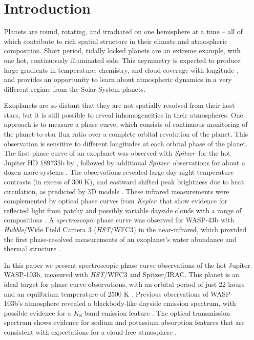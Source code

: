 \documentclass[twocolumn]{aastex61}
\newcommand{\project}[1]{\textsl{#1}}
\newcommand{\HST}{\project{HST}}
\newcommand{\Spitzer}{\project{Spitzer}}
\newcommand{\Kepler}{\project{Kepler}}
\begin{document}
\section{Introduction} \label{sec:intro}
Planets are round, rotating, and irradiated on one hemisphere at a time -- all of which contribute to rich spatial structure in their climate and atmospheric composition.  Short period, tidally locked planets are an extreme example, with one hot, continuously illuminated side. This asymmetry is expected to produce large gradients in temperature, chemistry, and cloud coverage with longitude \citep{showman09, kataria16, parmentier16}, and provides an opportunity to learn about atmospheric dynamics in a very different regime from the Solar System planets.

Exoplanets are so distant that they are not spatially resolved from their host stars, but it is still possible to reveal inhomogeneities in their atmospheres. One approach is to measure a phase curve, which consists of continuous monitoring of the planet-to-star flux ratio over a complete orbital revolution of the planet. This observation is sensitive to different longitudes at each orbital phase of the planet.  The first phase curve of an exoplanet was observed with \Spitzer\ for the hot Jupiter HD 189733b by \cite{knutson07}, followed by additional \Spitzer\ observations for about a dozen more systems \citep[cataloged in][]{parmentier17}.  The observations revealed large day-night temperature contrasts (in excess of 300 K), and eastward shifted peak brightness due to heat circulation, as predicted by 3D models \citep{showman02}.  These infrared measurements were complemented by optical phase curves from \Kepler\ that show evidence for reflected light from patchy and possibly variable dayside clouds with a range of compositions \citep{borucki09, demory13, hu15, armstrong16, parmentier16}. A \emph{spectroscopic} phase curve was observed for WASP-43b with \emph{Hubble}/Wide Field Camera 3 (\HST/WFC3) in the near-infrared, which provided the first phase-resolved measurements of an exoplanet's water abundance and thermal structure \citep{stevenson14, stevenson17}.

In this paper we present spectroscopic phase curve observations of the hot Jupiter WASP-103b, measured with \HST/WFC3 and Spitzer/IRAC. This planet is an ideal target for phase curve observations, with an orbital period of just 22 hours and an equilbrium temperature of 2500 K \citep{gillon14}.  Previous observations of WASP-103b's atmosphere revealed a blackbody-like dayside emission spectrum, with possible evidence for a $K_\mathrm{S}$-band emission feature \citep{cartier17, delrez18}. The optical transmission spectrum shows evidence for sodium and potassium absorption features that are consistent with expectations for a cloud-free atmosphere \citep{lendl17}.%
\end{document}
